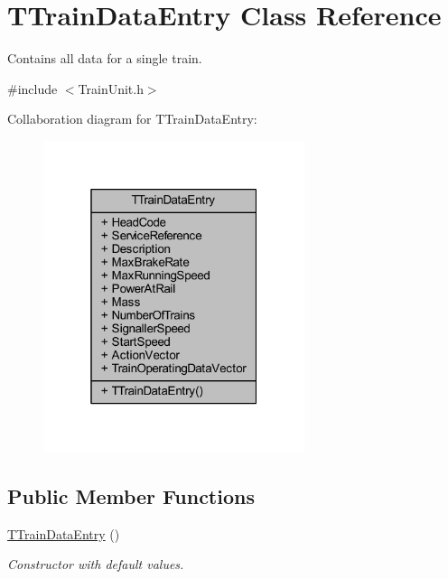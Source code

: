 \hypertarget{class_t_train_data_entry}{}\section{T\+Train\+Data\+Entry Class Reference}
\label{class_t_train_data_entry}


Contains all data for a single train.  




{\ttfamily \#include $<$Train\+Unit.\+h$>$}



Collaboration diagram for T\+Train\+Data\+Entry\+:\nopagebreak
\begin{figure}[H]
\begin{center}
\leavevmode
\includegraphics[width=217pt]{class_t_train_data_entry__coll__graph}
\end{center}
\end{figure}
\subsection*{Public Member Functions}
\begin{DoxyCompactItemize}
\item 
\mbox{\label{class_t_train_data_entry_a9e3a221ec9be3d20ee37c6c4d001ffa4}} 
\mbox{\hyperlink{class_t_train_data_entry_a9e3a221ec9be3d20ee37c6c4d001ffa4}{T\+Train\+Data\+Entry}} ()
\begin{DoxyCompactList}\small\item\em Constructor with default values. \end{DoxyCompactList}\end{DoxyCompactItemize}
